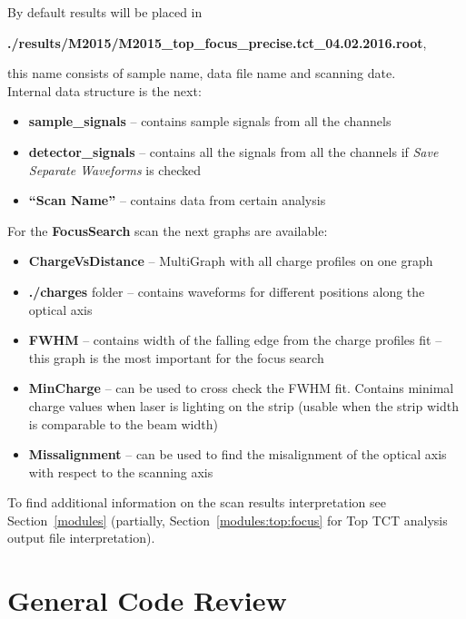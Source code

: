 \documentclass[12pt,oneside,notitlepage,abstracton,a4paper]{scrartcl}
\begin{document}
By default results will be placed in
\begin{displayquote}
 \textbf{./results/M2015/M2015\_top\_focus\_precise.tct\_04.02.2016.root},
\end{displayquote}
this name consists of sample name, data file name and scanning date.
\\ Internal data structure is the next:
\begin{itemize}
\item \textbf{sample\_signals} -- contains sample signals from all the channels
\item \textbf{detector\_signals} -- contains all the signals from all the channels if \textit{Save Separate Waveforms} is checked
\item \textbf{“Scan Name”} -- contains data from certain analysis
\end{itemize}
For the \textbf{FocusSearch} scan the next graphs are available:
\begin{itemize}
\item \textbf{ChargeVsDistance} -- MultiGraph with all charge profiles on one graph
\item \textbf{./charges} folder -- contains waveforms for different positions along the optical axis
\item \textbf{FWHM} -- contains width of the falling edge from the charge profiles fit – this graph is the most important for the focus search
\item \textbf{MinCharge} -- can be used to cross check the FWHM fit. Contains minimal charge values when laser is lighting on the strip (usable when the strip width is comparable to the beam width)
\item \textbf{Missalignment} -- can be used to find the misalignment of the optical axis with respect to the scanning axis
\end{itemize}

To find additional information on the scan results interpretation see Section~\ref{modules} (partially, Section~\ref{modules:top:focus} for  Top TCT analysis output file interpretation).

\section{General Code Review}\label{review}
\end{document}
